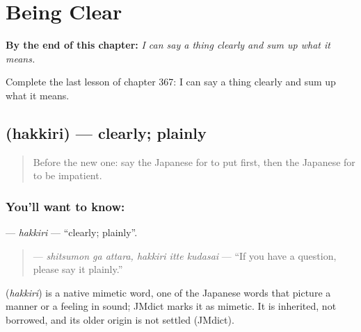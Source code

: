 
\chapter{Being Clear}
\label{ch:ja-being-clear}

\begin{chapteropening}
\textbf{By the end of this chapter:} \emph{I can say a thing clearly and sum up what it means.}

Complete the last lesson of chapter 367: I can say a thing clearly and sum up what it means.
\end{chapteropening}

\section[\texorpdfstring{\ja{はっきり} (hakkiri)}{はっきり (hakkiri)}]{ (hakkiri) — clearly; plainly}

\label{lesson:JA-C367-hakkiri}



\begin{quote}
Before the new one: say the Japanese for to put first, then the Japanese for to be impatient.
\end{quote}

\subsection*{You'll want to know: }
\textbf{} — \emph{hakkiri} — \textquotedblleft{}clearly; plainly\textquotedblright{}.

\begin{quote}
\textbf{   } — \emph{shitsumon ga attara, hakkiri itte kudasai} — \textquotedblleft{}If you have a question, please say it plainly.\textquotedblright{}
\end{quote}

\begin{cousinweb}
\textbf{} (\emph{hakkiri}) is a native mimetic word, one of the Japanese words that picture a manner or a feeling in sound; JMdict marks it as mimetic. It is inherited, not borrowed, and its older origin is not settled (JMdict).
\end{cousinweb}

